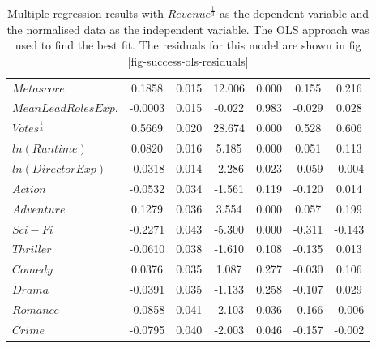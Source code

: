 \begin{table}[H]
\begin{center}
\begin{tabular}{lcccccc}
                    \textbf{$Metascore$}            &       0.1858  &        0.015     &    12.006  &         0.000        &        0.155    &        0.216     \\
                    \textbf{$Mean Lead Roles Exp.$} &      -0.0003  &        0.015     &    -0.022  &         0.983        &       -0.029    &        0.028     \\
                    \textbf{$Votes^{\frac{1}{3}}$}  &       0.5669  &        0.020     &    28.674  &         0.000        &        0.528    &        0.606     \\
                    \textbf{$ln(Runtime)$}          &       0.0820  &        0.016     &     5.185  &         0.000        &        0.051    &        0.113     \\
                    \textbf{$ln(Director Exp)$}     &      -0.0318  &        0.014     &    -2.286  &         0.023        &       -0.059    &       -0.004     \\
                    \textbf{$Action$}               &      -0.0532  &        0.034     &    -1.561  &         0.119        &       -0.120    &        0.014     \\
                    \textbf{$Adventure$}            &       0.1279  &        0.036     &     3.554  &         0.000        &        0.057    &        0.199     \\
                    \textbf{$Sci-Fi$}               &      -0.2271  &        0.043     &    -5.300  &         0.000        &       -0.311    &       -0.143     \\
                    \textbf{$Thriller$}             &      -0.0610  &        0.038     &    -1.610  &         0.108        &       -0.135    &        0.013     \\
                    \textbf{$Comedy$}               &       0.0376  &        0.035     &     1.087  &         0.277        &       -0.030    &        0.106     \\
                    \textbf{$Drama$}                &      -0.0391  &        0.035     &    -1.133  &         0.258        &       -0.107    &        0.029     \\
                    \textbf{$Romance$}              &      -0.0858  &        0.041     &    -2.103  &         0.036        &       -0.166    &       -0.006     \\
                    \textbf{$Crime$}                &      -0.0795  &        0.040     &    -2.003  &         0.046        &       -0.157    &       -0.002     \\
                    \bottomrule
                \end{tabular}
            \end{center}
        \caption[short]{Multiple regression results with $Revenue^{\frac{1}{3}}$ as the dependent variable
                        and the normalised data as the independent variable. The OLS approach was used to
                        find the best fit. The residuals for this model are shown in 
                        fig \ref{fig-success-ols-residuals}}\label{tab-success-ols-summary}
        \end{table}
